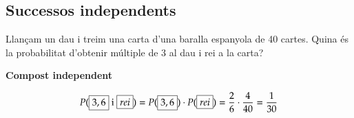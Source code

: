 \subsection{Successos independents}

\begin{resolt}[E]{
	
Llançam un dau i treim una carta d'una baralla espanyola de 40 cartes. Quina és la probabilitat d'obtenir múltiple de 3 al dau i rei a la carta?
	
}
	\textbf{Compost independent}

	\[P(\text{\boxed{3,6} i \boxed{rei}})= P(\text{\boxed{3,6}}) \cdot P(\text{\boxed{rei}}) = \frac{2}{6}\cdot \frac{4}{40}=\frac{1}{30} \]
	
\end{resolt}

